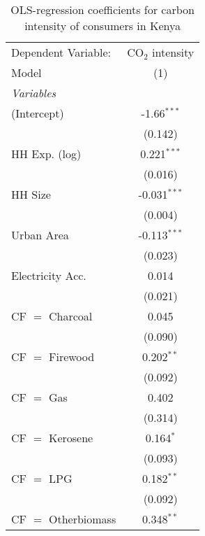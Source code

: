 
\begin{table}[htbp!]
   \centering
   \small
   \begin{adjustbox}{width = 1\textwidth, max height = 0.95\textheight, center}
      \begin{threeparttable}[b]
         \caption{\label{tab:OLS_1_KEN} OLS-regression coefficients for carbon intensity of consumers in Kenya}
         \begin{tabular}{lc}
            \tabularnewline \midrule \midrule
            Dependent Variable: & CO$_{2}$ intensity\\  
            Model               & (1)\\  
            \midrule
            \emph{Variables}\\
            (Intercept)         & -1.66$^{***}$\\   
                                & (0.142)\\   
            HH Exp. (log)       & 0.221$^{***}$\\   
                                & (0.016)\\   
            HH Size             & -0.031$^{***}$\\   
                                & (0.004)\\   
            Urban Area          & -0.113$^{***}$\\   
                                & (0.023)\\   
            Electricity Acc.    & 0.014\\   
                                & (0.021)\\   
            CF $=$ Charcoal     & 0.045\\   
                                & (0.090)\\   
            CF $=$ Firewood     & 0.202$^{**}$\\   
                                & (0.092)\\   
            CF $=$ Gas          & 0.402\\   
                                & (0.314)\\   
            CF $=$ Kerosene     & 0.164$^{*}$\\   
                                & (0.093)\\   
            CF $=$ LPG          & 0.182$^{**}$\\   
                                & (0.092)\\   
            CF $=$ Otherbiomass & 0.348$^{**}$\\   

\end{tabular}
\end{threeparttable}
\end{adjustbox}
\end{table}
